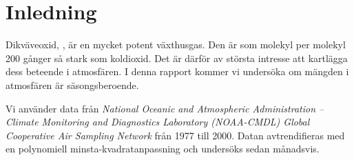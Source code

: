 \section{Inledning}
\label{sec:inledning}

Dikväveoxid, , är en mycket potent växthusgas. Den är som molekyl per molekyl 200 gånger så stark som koldioxid. Det är därför av största intresse att kartlägga dess beteende i atmosfären. I denna rapport kommer vi undersöka om mängden  i atmosfären är säsongsberoende.

Vi använder data från \emph{National Oceanic and Atmospheric
Administration – Climate Monitoring and Diagnostics
Laboratory (NOAA-CMDL) Global Cooperative Air
Sampling Network} från 1977 till 2000. Datan avtrendifieras med en polynomiell minsta-kvadratanpassning och undersöks sedan månadsvis.